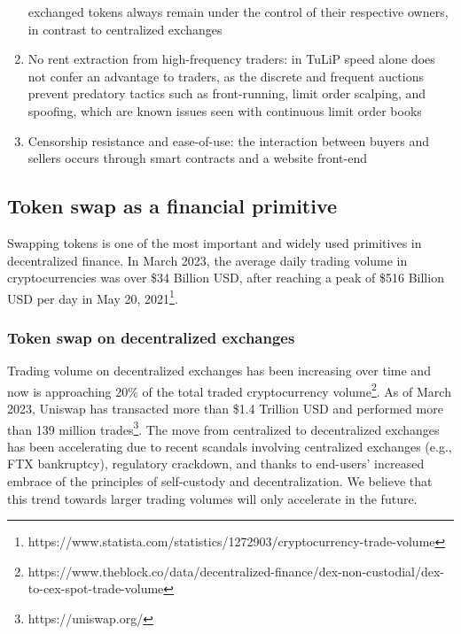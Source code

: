 \documentclass[11pt, reqno]{amsart}
\theoremstyle{definition}
\theoremstyle{remark}
\begin{document}
\begin{enumerate}
	      exchanged tokens always remain under the control of their respective
          owners, in contrast to centralized exchanges
	\item No rent extraction from high-frequency traders:
          in TuLiP speed alone does not confer an advantage to traders, as the
          discrete and frequent auctions prevent predatory tactics such as
          front-running, limit order scalping, and spoofing, which are known
          issues seen with continuous limit order books
    \item Censorship resistance and ease-of-use:
          the interaction between buyers and sellers occurs through smart
          contracts and a website front-end
\end{enumerate}


\subsection{Token swap as a financial primitive}
Swapping tokens is one of the most important and widely used primitives in
decentralized finance.
In March 2023, the average daily trading volume in cryptocurrencies was over
\$34 Billion USD, after reaching a peak of \$516 Billion USD per day in May 20,
2021\footnote{https://www.statista.com/statistics/1272903/cryptocurrency-trade-volume}.


\subsubsection{Token swap on decentralized exchanges}
Trading volume on decentralized exchanges has been increasing over time and now
is approaching 20\% of the total traded cryptocurrency
volume\footnote{https://www.theblock.co/data/decentralized-finance/dex-non-custodial/dex-to-cex-spot-trade-volume}.
As of March 2023, Uniswap has transacted more than \$1.4 Trillion USD and
performed more than 139 million trades\footnote{https://uniswap.org/}.
The move from centralized to decentralized exchanges has been accelerating due
to recent scandals involving centralized exchanges (e.g., FTX bankruptcy),
regulatory crackdown, and thanks to end-users' increased embrace of the
principles of self-custody and decentralization.
We believe that this trend towards larger trading volumes will only accelerate
in the future.
\end{document}
